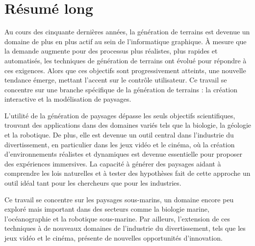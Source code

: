 \resetgraphicspath
{}

\chapter*{Résumé long}
Au cours des cinquante dernières années, la génération de terrains est devenue un domaine de plus en plus actif au sein de l'informatique graphique. À mesure que la demande augmente pour des processus plus réalistes, plus rapides et automatisés, les techniques de génération de terrains ont évolué pour répondre à ces exigences. Alors que ces objectifs sont progressivement atteints, une nouvelle tendance émerge, mettant l'accent sur le contrôle utilisateur. Ce travail se concentre sur une branche spécifique de la génération de terrains : la création interactive et la modélisation de paysages.

L'utilité de la génération de paysages dépasse les seuls objectifs scientifiques, trouvant des applications dans des domaines variés tels que la biologie, la géologie et la robotique. De plus, elle est devenue un outil central dans l'industrie du divertissement, en particulier dans les jeux vidéo et le cinéma, où la création d'environnements réalistes et dynamiques est devenue essentielle pour proposer des expériences immersives. La capacité à générer des paysages aidant à comprendre les lois naturelles et à tester des hypothèses fait de cette approche un outil idéal tant pour les chercheurs que pour les industries.


Ce travail se concentre sur les paysages sous-marins, un domaine encore peu exploré mais important dans des secteurs comme la biologie marine, l'océanographie et la robotique sous-marine. Par ailleurs, l'extension de ces techniques à de nouveaux domaines de l'industrie du divertissement, tels que les jeux vidéo et le cinéma, présente de nouvelles opportunités d'innovation.

